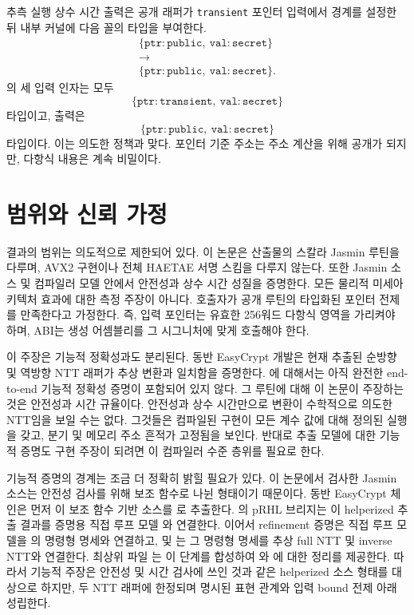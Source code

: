 \documentclass[10pt,twocolumn]{article}
\newcommand{\haetae}{HAETAE}
\newcommand{\jasmin}{Jasmin}
\newcommand{\ct}{상수 시간}
\begin{document}
추측 실행 \ct{} 출력은 공개 래퍼가 \texttt{transient} 포인터 입력에서
경계를 설정한 뒤 내부 커널에 다음 꼴의 타입을 부여한다.
\[
  \begin{array}{c}
  \{\texttt{ptr}:\texttt{public},\ \texttt{val}:\texttt{secret}\}\\
  \to\\
  \{\texttt{ptr}:\texttt{public},\ \texttt{val}:\texttt{secret}\}.
  \end{array}
\]
의 세 입력 인자는 모두
\[
  \{\texttt{ptr}:\texttt{transient},\ \texttt{val}:\texttt{secret}\}
\]
타입이고, 출력은
\[
  \{\texttt{ptr}:\texttt{public},\ \texttt{val}:\texttt{secret}\}
\]
타입이다. 이는 의도한 정책과 맞다. 포인터 기준 주소는 주소 계산을 위해
공개가 되지만, 다항식 내용은 계속 비밀이다.

\section{범위와 신뢰 가정}

결과의 범위는 의도적으로 제한되어 있다. 이 논문은 산출물의 스칼라
\jasmin{} 루틴을 다루며, AVX2 구현이나 전체 \haetae{} 서명 스킴을
다루지 않는다. 또한 \jasmin{} 소스 및 컴파일러 모델 안에서 안전성과
\ct{} 성질을 증명한다. 모든 물리적 미세아키텍처 효과에 대한 측정
주장이 아니다. 호출자가 공개 루틴의 타입화된 포인터 전제를 만족한다고
가정한다. 즉, 입력 포인터는 유효한 256워드 다항식 영역을 가리켜야 하며,
ABI는 생성 어셈블리를 그 시그니처에 맞게 호출해야 한다.

이 주장은 기능적 정확성과도 분리된다. 동반 EasyCrypt 개발은 현재
추출된 순방향 및 역방향 NTT 래퍼가 추상 변환과 일치함을 증명한다.
에 대해서는 아직 완전한 end-to-end 기능적
정확성 증명이 포함되어 있지 않다. 그 루틴에 대해 이 논문이 주장하는
것은 안전성과 시간 규율이다. 안전성과 \ct{}만으로 변환이 수학적으로
의도한 NTT임을 보일 수는 없다. 그것들은 컴파일된 구현이 모든 계수
값에 대해 정의된 실행을 갖고, 분기 및 메모리 주소 흔적가 고정됨을
보인다. 반대로 추출 모델에 대한 기능적 증명도 구현 주장이 되려면
이 컴파일러 수준 층위를 필요로 한다.

기능적 증명의 경계는 조금 더 정확히 밝힐 필요가 있다. 이 논문에서
검사한 \jasmin{} 소스는 안전성 검사를 위해 보조 함수로 나뉜 형태이기
때문이다. 동반 EasyCrypt 체인은 먼저 이 보조 함수 기반 소스를
로 추출한다. 의 pRHL
브리지는 이 helperized 추출 결과를 증명용 직접 루프 모델
와 연결한다. 이어서 refinement 증명은 직접 루프
모델을 의 명령형 명세와 연결하고,
 및 는 그 명령형 명세를
추상 full NTT 및 inverse NTT와 연결한다. 최상위 파일
는 이 단계를 합성하여 와
에 대한 정리를 제공한다. 따라서 기능적 주장은
안전성 및 시간 검사에 쓰인 것과 같은 helperized 소스 형태를 대상으로
하지만, 두 NTT 래퍼에 한정되며 명시된 표현 관계와 입력 bound 전제 아래
성립한다.
\end{document}
